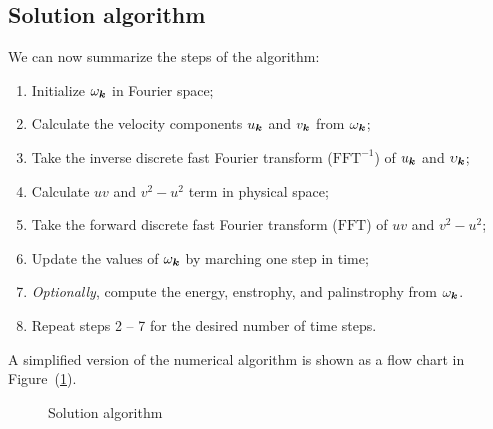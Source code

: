 \documentclass[12pt]{article}
\begin{document}
\subsection{Solution algorithm}
We can now summarize the steps of the algorithm:
\begin{enumerate}
\item Initialize $\omega_{{\bm k}}$ in Fourier space;
\item Calculate the velocity components $u_{\bm k}$ and $v_{\bm k}$ from $\omega_{{\bm k}}$;
\item Take the inverse discrete fast Fourier transform
  ($\text{FFT}^{-1}$) of $u_{\bm k}$ and $\upsilon_{\bm k}$;
\item Calculate $uv$ and $v^2-u^2$ term in physical space;
\item Take the forward discrete fast Fourier transform ($\text{FFT}$) of
$uv$ and $v^2-u^2$;
\item Update the values of $\omega_{\bm k}$ by marching one step in time;
\item \emph{Optionally}, compute the energy, enstrophy, and palinstrophy from $\omega_{\bm k}$.
\item Repeat steps 2 -- 7 for the desired number of time steps.
\end{enumerate}
A simplified version of the numerical algorithm is shown as a flow chart in Figure~(\ref{algorithm}). 

\begin{figure}[ht]
\begin{center}
\caption{Solution algorithm}\label{algorithm}
\end{center}
\end{figure}

\hypertarget{Bibliography}{}


\end{document}
